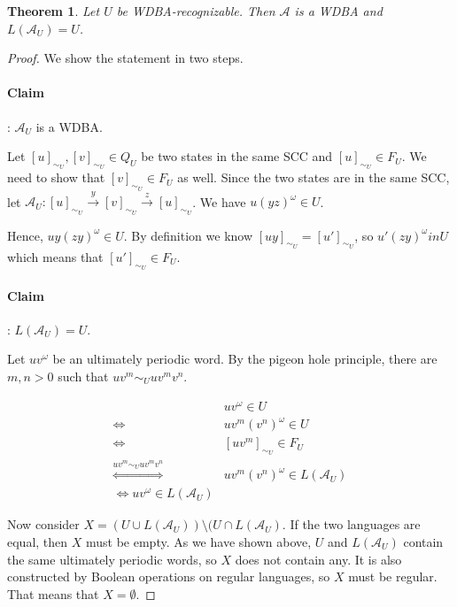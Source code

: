 \documentclass{article}
\newtheorem{theorem}{Theorem}[section]
\begin{document}
\vspace{.5cm}
\begin{theorem}
	Let $U$ be WDBA-recognizable. Then $\mathcal{A}$ is a WDBA and $L(\mathcal{A}_U) = U$.
\end{theorem}
\begin{proof}
	We show the statement in two steps.

	\paragraph{Claim}: $\mathcal{A}_U$ is a WDBA.
	
	Let $[u]_{\sim_U}, [v]_{\sim_U} \in Q_U$ be two states in the same SCC and $[u]_{\sim_U} \in F_U$.
	 We need to show that $[v]_{\sim_U} \in F_U$ as well. Since the two states are in the same SCC, let $\mathcal{A}_U : [u]_{\sim_U} \overset{y}{\rightarrow} [v]_{\sim_U} \overset{z}{\rightarrow} [u]_{\sim_U}$. We have $u(yz)^\omega \in U$. %
	 
	 Hence, $uy(zy)^\omega \in U$. By definition we know $[uy]_{\sim_U} = [u']_{\sim_U}$, so $u'(zy)^\omega in U$ which means that $[u']_{\sim_U} \in F_U$.
	 
	 \paragraph{Claim}: $L(\mathcal{A}_U) = U$.
	 
	 Let $uv^\omega$ be an ultimately periodic word. By the pigeon hole principle, there are $m, n > 0$ such that $uv^m \sim_U uv^mv^n$. 
	 
	 \begin{align*}
	 	& u v^\omega \in U \\
	 	\Leftrightarrow & u v^m (v^n)^\omega \in U \\
	 	\Leftrightarrow & [u v^m]_{\sim_U} \in F_U \\
	 	\overset{uv^m \sim_U uv^mv^n}{\Leftrightarrow} & u v^m (v^n)^\omega \in L(\mathcal{A}_U) \\
	 	\Leftrightarrow uv^\omega \in L(\mathcal{A}_U)
	 \end{align*}
	 
	 Now consider $X = (U \cup L(\mathcal{A}_U)) \setminus (U \cap L(\mathcal{A}_U)$. If the two languages are equal, then $X$ must be empty. As we have shown above, $U$ and $L(\mathcal{A}_U)$ contain the same ultimately periodic words, so $X$ does not contain any. It is also constructed by Boolean operations on regular languages, so $X$ must be regular. That means that $X = \emptyset$.
\end{proof}
\end{document}
